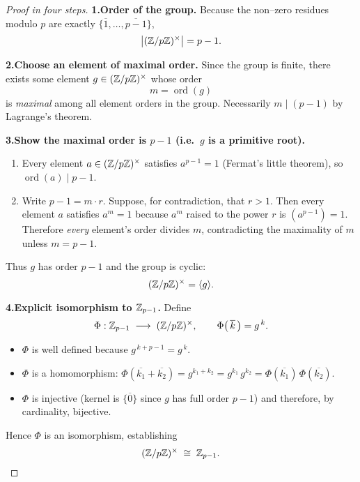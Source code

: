 \documentclass[12pt]{article}
\theoremstyle{definition} %
\theoremstyle{plain} %
\begin{document}
      \begin{proof}[Proof in four steps]
      \textbf{1.\;Order of the group.}
      Because the non–zero residues modulo $p$ are exactly
      $\{\overline{1},\dots,\overline{p-1}\}$,
      \[
         \bigl|(\Bbb Z/p\Bbb Z)^{\times}\bigr|=p-1.
      \]
      
      \smallskip
      \textbf{2.\;Choose an element of maximal order.}
      Since the group is finite, there exists some element
      $g\in(\Bbb Z/p\Bbb Z)^{\times}$ whose order
      \[
          m=\operatorname{ord}(g)
      \]
      is \emph{maximal} among all element orders in the group.
      Necessarily $m\mid(p-1)$ by Lagrange’s theorem.
      
      \smallskip
      \textbf{3.\;Show the maximal order is $p-1$ (i.e.\ $g$ is a primitive root).}
      
      \begin{enumerate}[label=(\alph*),leftmargin=*]
         \item
         Every element $a\in(\Bbb Z/p\Bbb Z)^{\times}$ satisfies
         $a^{p-1}=1$ (Fermat’s little theorem), so
         $\operatorname{ord}(a)\mid p-1$.
         \item
         Write $p-1=m\cdot r$.
         Suppose, for contradiction, that $r>1$.
         Then every element $a$ satisfies $a^{m}=1$
         because $a^{m}$ raised to the power $r$
         is $(a^{p-1})=1$.
         Therefore \emph{every} element’s order
         divides $m$, contradicting the maximality of $m$
         unless $m=p-1$.
      \end{enumerate}
      
      Thus $g$ has order $p-1$ and the group is cyclic:
      \[
         (\Bbb Z/p\Bbb Z)^{\times}=\langle g\rangle.
      \]
      
      \smallskip
      \textbf{4.\;Explicit isomorphism to $\Bbb Z_{p-1}$.}
      Define
      \[
         \Phi:\Bbb Z_{p-1}\;\longrightarrow\;(\Bbb Z/p\Bbb Z)^{\times},
         \qquad
         \Phi\bigl(\,\overline{k}\,\bigr)=g^{\,k}.
      \]
      \begin{itemize}
         \item $\Phi$ is well defined because $g^{\,k+p-1}=g^{\,k}$.
         \item $\Phi$ is a homomorphism:
               $\Phi(\overline{k_1}+\overline{k_2})=g^{k_1+k_2}
               =g^{k_1}\,g^{k_2}
               =\Phi(\overline{k_1})\,\Phi(\overline{k_2})$.
         \item $\Phi$ is injective (kernel is $\{\overline{0}\}$ since
               $g$ has full order $p-1$) and therefore, by cardinality,
               bijective.
      \end{itemize}
      Hence $\Phi$ is an isomorphism, establishing
      \[
         (\Bbb Z/p\Bbb Z)^{\times}\;\cong\;\Bbb Z_{p-1}.
      \]
      \end{proof}
      
\end{document}
